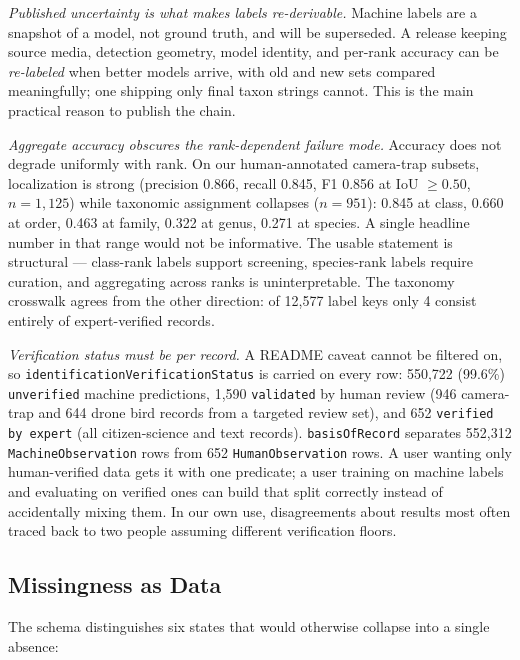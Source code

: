 \documentclass[sigconf]{acmart}
\begin{document}
\emph{Published uncertainty is what makes labels re-derivable.} Machine
labels are a snapshot of a model, not ground truth, and will be
superseded. A release keeping source media, detection geometry, model
identity, and per-rank accuracy can be \emph{re-labeled} when better
models arrive, with old and new sets compared meaningfully; one shipping
only final taxon strings cannot. This is the main practical reason to
publish the chain.

\emph{Aggregate accuracy obscures the rank-dependent failure mode.}
Accuracy does not degrade uniformly with rank. On our human-annotated
camera-trap subsets, localization is strong (precision 0.866, recall
0.845, F1 0.856 at IoU $\geq 0.50$, $n{=}1{,}125$) while taxonomic
assignment collapses ($n{=}951$): 0.845 at class, 0.660 at order,
0.463 at family, 0.322 at genus, 0.271 at species. A single headline number in that range would
not be informative. The usable statement is structural ---
class-rank labels support screening, species-rank labels require
curation, and aggregating across ranks is uninterpretable. The taxonomy
crosswalk agrees from the other direction: of 12{,}577 label keys only 4
consist entirely of expert-verified records.

\emph{Verification status must be per record.} A README caveat cannot be
filtered on, so \texttt{identification\allowbreak Verification\allowbreak Status} is carried on
every row: 550{,}722 (99.6\%) \texttt{unverified} machine predictions,
1{,}590 \texttt{validated} by human review (946 camera-trap and 644
drone bird records from a targeted review set), and 652
\texttt{verified by expert} (all citizen-science and text records).
\texttt{basisOfRecord} separates 552{,}312 \texttt{MachineObservation}
rows from 652 \texttt{HumanObservation} rows. A user wanting only
human-verified data gets it with one predicate; a user training on
machine labels and evaluating on verified ones can build that split
correctly instead of accidentally mixing them. In our own use, disagreements about
results most often traced back to two people assuming different
verification floors.

\subsection{Missingness as Data}

The schema distinguishes six states that would otherwise collapse into a
single absence:
\end{document}
